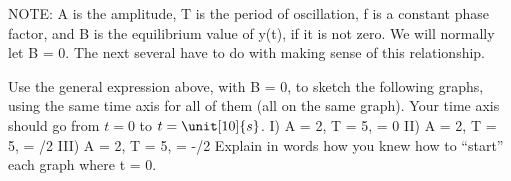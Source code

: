 \label{fnt8.4.2-1}

NOTE: A is the amplitude, T is the period of oscillation, f is a constant phase factor, and B is the equilibrium value of y(t), if it is not zero.  We will normally let B = 0.  The next several \FNTs{} have to do with making sense of this relationship.

Use the general expression above, with B = 0, to sketch the following graphs, using the same time axis for all of them (all on the same graph).  Your time axis should go from $t = 0$ to $t = \unit[10]{s}$.   
I)  A = 2, T = 5, \phi = 0           II)  A = 2, T = 5, \phi = \pi/2          III)  A = 2, T = 5, \phi = -\pi/2
Explain in words how you knew how to ``start'' each graph where t = 0.